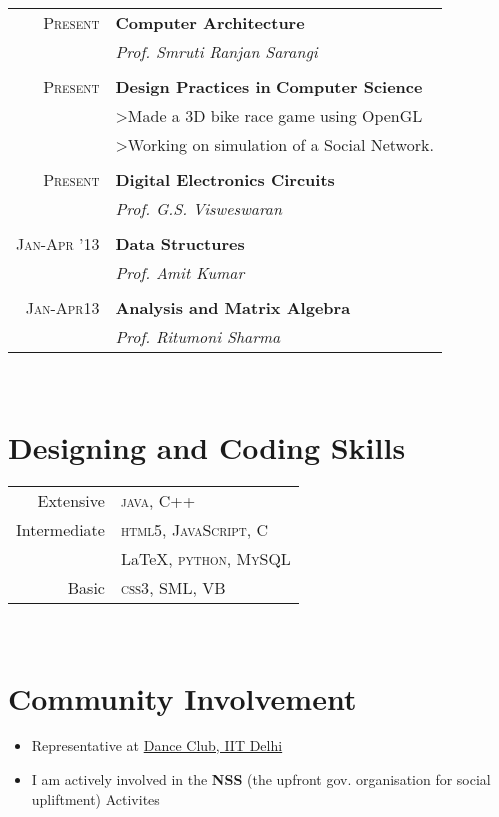\documentclass[10pt]{article} %
\begin{document}
{\begin{minipage}[t]{0.44\textwidth}
\begin{tabular}{rl}
 \textsc{Present} & \textbf{Computer Architecture}\\
& \textit{Prof. Smruti Ranjan Sarangi}\\\\
\textsc{Present} & \textbf{Design Practices in} \textbf{Computer Science}\\
&\footnotesize{>Made a 3D bike race game using OpenGL} \\ 
&\footnotesize{>Working on simulation of a Social Network.} \\ \\
 \textsc{Present} & \textbf{Digital Electronics Circuits}\\
& \textit{Prof. G.S. Visweswaran}\\\\
 \textsc{Jan-Apr '13} & \textbf{Data Structures}\\
& \textit{Prof. Amit Kumar}\\\\
\textsc{Jan-Apr13} & \textbf{Analysis and Matrix Algebra}\\
& \textit{Prof. Ritumoni Sharma}
\end{tabular}\\[10pt]


\section{Designing and Coding Skills} 

\begin{tabular}{rl}
Extensive
& \textsc{java}, C++\\[2pt]
Intermediate
& \textsc{html5}, \textsc{JavaScript, C}\\ & \LaTeX, \textsc{python, MySQL}\\[2pt]
Basic
& \textsc{css3}, \textsc{SML}, VB
\end{tabular}
\\

\section{Community Involvement}
\begin{itemize} \itemsep1pt 
\item Representative at \href{https://www.facebook.com/DanceClub.IITDelhi}{Dance Club, IIT Delhi}
\item I am actively involved in the \textbf{NSS} (the upfront gov. organisation for social upliftment) Activites
\end{itemize}


\end{minipage}}
\end{document}
